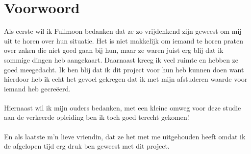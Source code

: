 \chapter*{Voorwoord} 

Als eerste wil ik Fullmoon bedanken dat ze zo vrijdenkend zijn geweest om mij uit te horen over hun situatie. Het is niet makkelijk om iemand te horen praten over zaken die niet goed gaan bij hun, maar ze waren juist erg blij dat ik sommige dingen heb aangekaart. Daarnaast kreeg ik veel ruimte en hebben ze goed meegedacht. Ik ben blij dat ik dit project voor hun heb kunnen doen want hierdoor heb ik echt het gevoel gekregen dat ik met mijn afstuderen waarde voor iemand heb gecreëerd.
\\\\
Hiernaast wil ik mijn ouders bedanken, met een kleine omweg voor deze studie aan de verkeerde opleiding ben ik toch goed terecht gekomen!
\\\\
En als laatste m'n lieve vriendin, dat ze het met me uitgehouden heeft omdat ik de afgelopen tijd erg druk ben geweest met dit project.